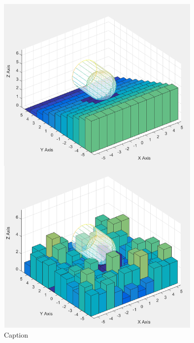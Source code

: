 \documentclass[%
    fourtothree=true, %
    DepLogo=true     %
    ]{ETHpres}
\begin{document}
\begin{minipage}{0.39\textwidth}
	\centering
	\includegraphics[width=0.75\textwidth]{SlopeStdDev.png}\\
	\footnotesize{Caption}
\end{minipage}

\clearpage

\end{document}
